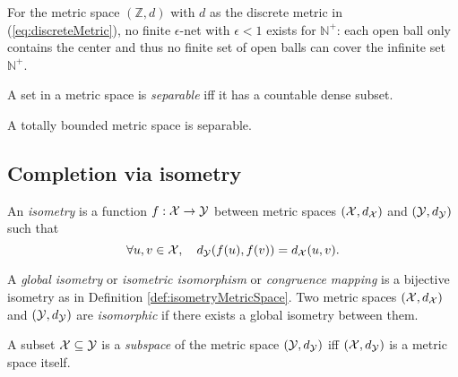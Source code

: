 \begin{exm}
  For the metric space $(\mathbb{Z},d)$
  with $d$ as the discrete metric in (\ref{eq:discreteMetric}),
  no finite $\epsilon$-net with $\epsilon<1$
  exists for $\mathbb{N}^+$:
  each open ball only contains the center
  and thus no finite set of open balls
  can cover the infinite set $\mathbb{N}^+$.
\end{exm}

\begin{defn}
  \label{def:separableMetricSpace}
  A set in a metric space is \emph{separable}
  iff it has a countable dense subset.
\end{defn}

\begin{lem}
  \label{lem:totalBoundedImpliesSeparable}
  A totally bounded metric space is separable.
\end{lem}

\subsection{Completion via isometry}
\label{sec:compl-via-isom}

\begin{defn}
  \label{def:isometryMetricSpace}
  An \emph{isometry} is a function $f: {\cal X}\rightarrow{\cal Y}$
  between metric spaces $({\cal X}, d_{{\cal X}})$
  and $({\cal Y}, d_{{\cal Y}})$
  such that
  \begin{equation}
    \label{eq:isometryMetricSpace}
    \forall u,v\in {\cal X},\quad
    d_{{\cal Y}}(f(u),f(v)) = d_{{\cal X}}(u,v).
  \end{equation}
\end{defn}

\begin{defn}
  \label{def:isometricIsomorphism}
  A \emph{global isometry} or \emph{isometric isomorphism}
  or \emph{congruence mapping}
  is a bijective isometry
  as in Definition \ref{def:isometryMetricSpace}.
  Two metric spaces $({\cal X}, d_{{\cal X}})$
  and $({\cal Y}, d_{{\cal Y}})$
  are \emph{isomorphic} if there exists
  a global isometry between them.
\end{defn}

\begin{defn}
  \label{def:subspaceMetric}
  A subset ${\cal X}\subseteq {\cal Y}$
  is a \emph{subspace} of the metric space
  $({\cal Y}, d_{{\cal Y}})$ iff
  $({\cal X}, d_{{\cal Y}})$ is a metric space itself.
\end{defn}

